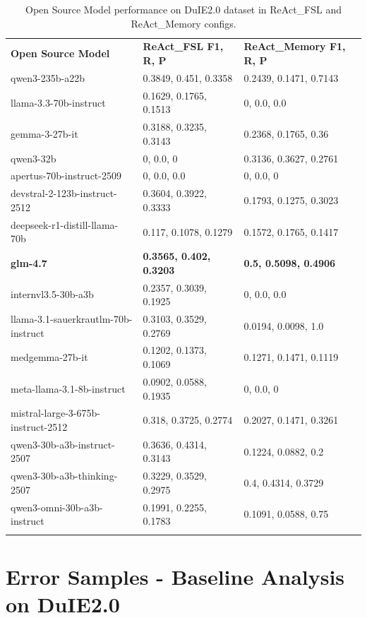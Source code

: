 \begin{table}[h]
\centering
\caption{Open Source Model performance on DuIE2.0 dataset in ReAct\_FSL and ReAct\_Memory configs.}
\label{tab:model_selection}
\begin{tabular}{lll}\textbf{Open Source Model} & \textbf{ReAct\_FSL {F1, R, P}}& \textbf{ReAct\_Memory {F1, R, P}}\\
qwen3-235b-a22b & {0.3849, 0.451, 0.3358} & {0.2439, 0.1471, 0.7143} \\
llama-3.3-70b-instruct & {0.1629, 0.1765, 0.1513}& {0, 0.0, 0.0} \\
gemma-3-27b-it & {0.3188, 0.3235, 0.3143} & {0.2368, 0.1765, 0.36}  \\
qwen3-32b & {0, 0.0, 0} & {0.3136, 0.3627, 0.2761}\\
apertus-70b-instruct-2509 & {0, 0.0, 0.0} & {0, 0.0, 0}\\
devstral-2-123b-instruct-2512 & {0.3604, 0.3922, 0.3333} & {0.1793, 0.1275, 0.3023}\\
deepseek-r1-distill-llama-70b & {0.117, 0.1078, 0.1279} & {0.1572, 0.1765, 0.1417}\\
\textbf{glm-4.7} & \textbf{{0.3565, 0.402, 0.3203}} & \textbf{{0.5, 0.5098, 0.4906}} \\
internvl3.5-30b-a3b & {0.2357, 0.3039, 0.1925} & {0, 0.0, 0.0}\\
llama-3.1-sauerkrautlm-70b-instruct & {0.3103, 0.3529, 0.2769} & {0.0194, 0.0098, 1.0}\\
medgemma-27b-it & {0.1202, 0.1373, 0.1069} & {0.1271, 0.1471, 0.1119}\\
meta-llama-3.1-8b-instruct & {0.0902, 0.0588, 0.1935} & {0, 0.0, 0}\\
mistral-large-3-675b-instruct-2512 & {0.318, 0.3725, 0.2774} & {0.2027, 0.1471, 0.3261}\\
qwen3-30b-a3b-instruct-2507 & {0.3636, 0.4314, 0.3143} & {0.1224, 0.0882, 0.2}\\
qwen3-30b-a3b-thinking-2507 & {0.3229, 0.3529, 0.2975} & {0.4, 0.4314, 0.3729}\\
qwen3-omni-30b-a3b-instruct & {0.1991, 0.2255, 0.1783} & {0.1091, 0.0588, 0.75}\\
& & \\
\end{tabular}
\end{table}

\section{Error Samples - Baseline Analysis on DuIE2.0}
\label{app:error_analysis_baseline_ablation}

